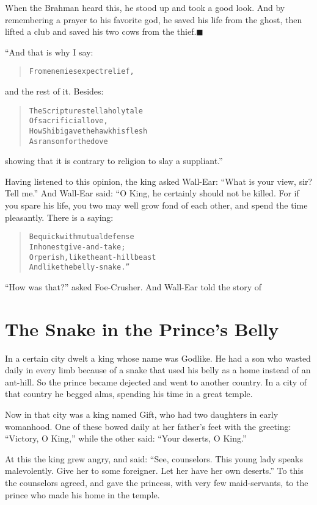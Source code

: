 \documentclass[article, twoside, 14pt]{memoir}
\newcommand{\qed}{\hfill \ensuremath{\blacksquare}}
\renewenvironment{verbatim}{%
\begin{quote}%
\vskip -10pt%
\begin{alltt}\normalfont\large}{\end{alltt}%
\end{quote}%
\vskip -10pt
} %
\begin{document}
When the Brahman heard this, he stood up and took a good look. And
by remembering a prayer to his favorite god, he saved his life from
the ghost, then lifted a club and saved his two cows from the
thief.\hyperref[s57]{\qed}

“And that is why I say:

\begin{verbatim}
From enemies expect relief,
\end{verbatim}
and the rest of it. Besides:

\begin{verbatim}
The Scriptures tell a holy tale
    Of sacrificial love,
How Shibi gave the hawk his flesh
    As ransom for the dove{\textemdash}
\end{verbatim}
showing that it is contrary to religion to slay a suppliant.”

Having listened to this opinion, the king asked Wall-Ear:
``What is your view, sir? Tell me.'' And Wall-Ear said: “O King, he
certainly should not be killed. For if you spare his life, you two
may well grow fond of each other, and spend the time pleasantly.
There is a saying:

\begin{verbatim}
Be quick with mutual defense
    In honest give-and-take;
Or perish, like the ant-hill beast
    And like the belly-snake.”
\end{verbatim}
``How was that?'' asked Foe-Crusher. And Wall-Ear told the story
of

\chapter{The Snake in the Prince's Belly}

\label{s58}

In a certain city dwelt a king whose name was Godlike. He had a son
who wasted daily in every limb because of a snake that used his
belly as a home instead of an ant-hill. So the prince became
dejected and went to another country. In a city of that country he
begged alms, spending his time in a great temple.

Now in that city was a king named Gift, who had two daughters in
early womanhood. One of these bowed daily at her father's feet with
the greeting: ``Victory, O King,'' while the other said:
``Your deserts, O King.''

At this the king grew angry, and said:
``See, counselors. This young lady speaks malevolently. Give her to some foreigner. Let her have her own deserts.''
To this the counselors agreed, and gave the princess, with very few
maid-servants, to the prince who made his home in the temple.
\end{document}
